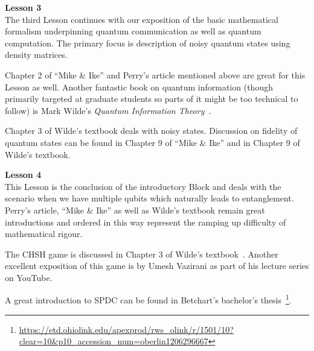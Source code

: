 {\bf Lesson 3}\\

The third Lesson continues with our exposition of the basic mathematical formalism underpinning quantum communication as well as quantum computation. The primary focus is description of noisy quantum states using density matrices.

Chapter 2 of “Mike \& Ike” and Perry’s article mentioned above are great for this Lesson as well. Another fantastic book on quantum information (though primarily targeted at graduate students so parts of it might be too technical to follow) is Mark Wilde's \emph{Quantum Information Theory}~\cite{wilde2013quantum}.

Chapter 3 of Wilde’s textbook deals with noisy states. Discussion on fidelity of quantum states can be found in Chapter 9 of “Mike \& Ike” and in Chapter 9 of Wilde’s textbook.

{\bf Lesson 4}\\

This Lesson is the conclusion of the introductory Block and deals with the scenario when we have multiple qubits which naturally leads to entanglement. Perry’s article, “Mike \& Ike” as well as Wilde’s textbook remain great introductions and ordered in this way represent the ramping up difficulty of mathematical rigour. 

The CHSH game is discussed in Chapter 3 of Wilde’s textbook~\cite{wilde2013quantum}. Another excellent exposition of this game is by Umesh Vazirani as part of his lecture series on YouTube.

A great introduction to SPDC can be found in Betchart’s bachelor's thesis~\footnote{\url{https://etd.ohiolink.edu/apexprod/rws_olink/r/1501/10?clear=10&p10_accession_num=oberlin1206296667}}.

